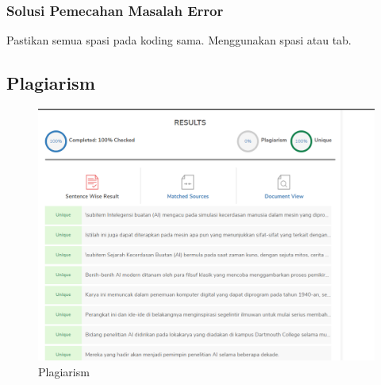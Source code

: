 \subsubsection{Solusi Pemecahan Masalah Error}
Pastikan semua spasi pada koding sama. Menggunakan spasi atau tab.

\subsection{Plagiarism}
\begin{figure}[ht]
\centering
\includegraphics[scale=0.5]{figures/1174050/chapter1/plagiarism.png}
\caption{Plagiarism}
\end{figure}